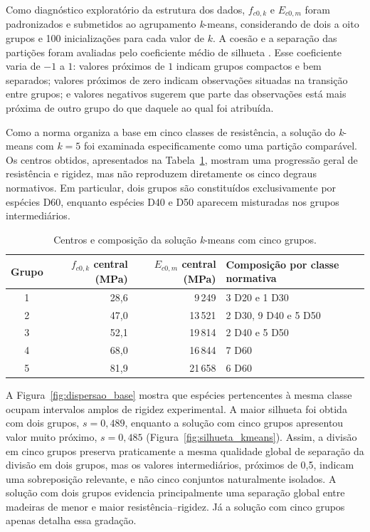 Como diagnóstico exploratório da estrutura dos dados, $f_{c0,k}$ e $E_{c0,m}$ foram padronizados e submetidos ao agrupamento \textit{k}-means, considerando de dois a oito grupos e 100 inicializações para cada valor de $k$. A coesão e a separação das partições foram avaliadas pelo coeficiente médio de silhueta \parencite{Rousseeuw1987}. Esse coeficiente varia de $-1$ a $1$: valores próximos de $1$ indicam grupos compactos e bem separados; valores próximos de zero indicam observações situadas na transição entre grupos; e valores negativos sugerem que parte das observações está mais próxima de outro grupo do que daquele ao qual foi atribuída.

Como a norma organiza a base em cinco classes de resistência, a solução do \textit{k}-means com $k=5$ foi examinada especificamente como uma partição comparável. Os centros obtidos, apresentados na Tabela~\ref{tab:centros_kmeans}, mostram uma progressão geral de resistência e rigidez, mas não reproduzem diretamente os cinco degraus normativos. Em particular, dois grupos são constituídos exclusivamente por espécies D60, enquanto espécies D40 e D50 aparecem misturadas nos grupos intermediários.

\begin{table}[H]
\centering
\caption{Centros e composição da solução \textit{k}-means com cinco grupos.}\label{tab:centros_kmeans}
\begin{tabular}{crrl}
\toprule
Grupo & $f_{c0,k}$ central (MPa) & $E_{c0,m}$ central (MPa) & Composição por classe normativa \\
\midrule
1 & 28,6 & 9\,249  & 3 D20 e 1 D30 \\
2 & 47,0 & 13\,521 & 2 D30, 9 D40 e 5 D50 \\
3 & 52,1 & 19\,814 & 2 D40 e 5 D50 \\
4 & 68,0 & 16\,844 & 7 D60 \\
5 & 81,9 & 21\,658 & 6 D60 \\
\bottomrule
\end{tabular}
\end{table}

A Figura~\ref{fig:dispersao_base} mostra que espécies pertencentes à mesma classe ocupam intervalos amplos de rigidez experimental. A maior silhueta foi obtida com dois grupos, $s=0{,}489$, enquanto a solução com cinco grupos apresentou valor muito próximo, $s=0{,}485$ (Figura~\ref{fig:silhueta_kmeans}). Assim, a divisão em cinco grupos preserva praticamente a mesma qualidade global de separação da divisão em dois grupos, mas os valores intermediários, próximos de 0,5, indicam uma sobreposição relevante, e não cinco conjuntos naturalmente isolados. A solução com dois grupos evidencia principalmente uma separação global entre madeiras de menor e maior resistência--rigidez. Já a solução com cinco grupos apenas detalha essa gradação.

